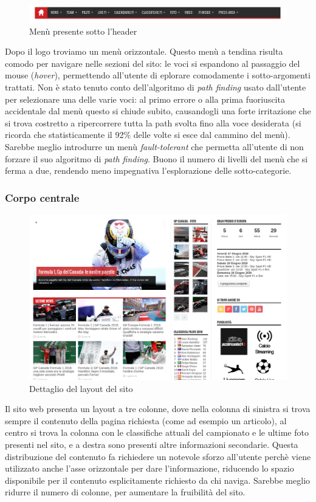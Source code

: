 \begin{figure}[H]
  \centering
  \includegraphics[scale=0.3]{top_menu}
  \caption{Menù presente sotto l'header}
\end{figure}
Dopo il logo troviamo un men\`u orizzontale. Questo men\`u a tendina risulta
comodo per navigare nelle sezioni del sito: le voci si espandono al passaggio
del mouse (\textit{hover}), permettendo all'utente di eplorare comodamente i
sotto-argomenti trattati. Non \`e stato tenuto conto dell'algoritmo di
\textit{path finding} usato dall'utente per selezionare una delle varie voci: al
primo errore o alla prima fuoriuscita accidentale dal men\`u questo si chiude
subito, causandogli una forte irritazione che si trova
costretto a ripercorrere tutta la path svolta fino alla voce desiderata (si
ricorda che statisticamente il 92\% delle volte si esce dal cammino del men\`u).
Sarebbe meglio introdurre un men\`u \textit{fault-tolerant} che permetta
all'utente di non forzare il suo algoritmo di \textit{path finding}. Buono il
numero di livelli del men\`u che si ferma a due, rendendo meno impegnativa
l'esplorazione delle sotto-categorie.

\subsubsection{Corpo centrale}


\begin{figure}[H]
  \centering
  \includegraphics[scale=0.2]{layout}
  \caption{Dettaglio del layout del sito}
\end{figure}
Il sito web presenta un layout a tre colonne, dove nella colonna di sinistra si
trova sempre il contenuto della pagina richiesta (come ad esempio un articolo),
al centro si trova la colonna con le classifiche attuali del campionato e le
ultime foto presenti nel sito, e a destra sono presenti altre informazioni
secondarie. Questa distribuzione del contenuto fa richiedere un notevole sforzo
all'utente perch\`e viene utilizzato anche l'asse orizzontale per dare
l'informazione, riducendo lo spazio disponibile per il contenuto esplicitamente
richiesto da chi naviga. Sarebbe meglio ridurre il numero di colonne, per
aumentare la fruibilit\`a del sito.


